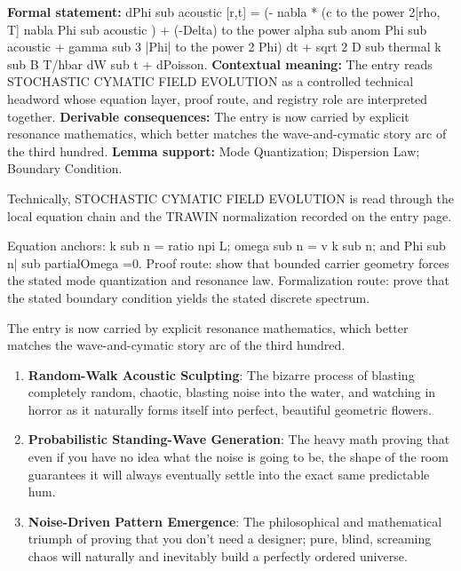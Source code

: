 \begingroup\footnotesize\setlength{\emergencystretch}{3em}\sloppy
\textbf{Formal statement:} dPhi sub acoustic [r,t] = (- nabla * (c to the power 2[rho, T] nabla Phi sub acoustic ) + (-Delta) to the power alpha sub anom Phi sub acoustic + gamma sub 3 |Phi| to the power 2 Phi) dt + sqrt 2 D sub thermal k sub B T/hbar dW sub t + dPoisson. \textbf{Contextual meaning:} The entry reads STOCHASTIC CYMATIC FIELD EVOLUTION as a controlled technical headword whose equation layer, proof route, and registry role are interpreted together. \textbf{Derivable consequences:} The entry is now carried by explicit resonance mathematics, which better matches the wave-and-cymatic story arc of the third hundred. \textbf{Lemma support:} Mode Quantization; Dispersion Law; Boundary Condition.\par
\endgroup

Technically, STOCHASTIC CYMATIC FIELD EVOLUTION is read through the local equation chain and the TRAWIN normalization recorded on the entry page.

Equation anchors: k sub n = ratio npi L; omega sub n = v k sub n; and Phi sub n| sub partialOmega =0. Proof route: show that bounded carrier geometry forces the stated mode quantization and resonance law. Formalization route: prove that the stated boundary condition yields the stated discrete spectrum.

The entry is now carried by explicit resonance mathematics, which better matches the wave-and-cymatic story arc of the third hundred.
\endgroup

\begin{enumerate}[leftmargin=1.6em,itemsep=6pt,topsep=4pt]
\item \textbf{Random-Walk Acoustic Sculpting}: The bizarre process of blasting completely random, chaotic, blasting noise into the water, and watching in horror as it naturally forms itself into perfect, beautiful geometric flowers.
\item \textbf{Probabilistic Standing-Wave Generation}: The heavy math proving that even if you have no idea what the noise is going to be, the shape of the room guarantees it will always eventually settle into the exact same predictable hum.
\item \textbf{Noise-Driven Pattern Emergence}: The philosophical and mathematical triumph of proving that you don't need a designer; pure, blind, screaming chaos will naturally and inevitably build a perfectly ordered universe.
\end{enumerate}


